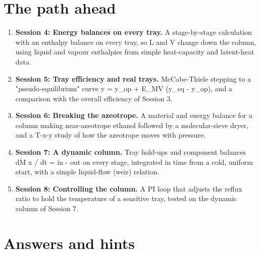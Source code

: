 \documentclass[11pt,a4paper]{article}
\begin{document}
\section{The path ahead}
\begin{enumerate}[nosep]
\item \textbf{Session 4: Energy balances on every tray.} A stage-by-stage calculation with an enthalpy balance on every tray, so L and V change down the column, using liquid and vapour enthalpies from simple heat-capacity and latent-heat data.
\item \textbf{Session 5: Tray efficiency and real trays.} McCabe-Thiele stepping to a "pseudo-equilibrium" curve y = y\_op + E\_MV (y\_eq - y\_op), and a comparison with the overall efficiency of Session 3.
\item \textbf{Session 6: Breaking the azeotrope.} A material and energy balance for a column making near-azeotrope ethanol followed by a molecular-sieve dryer, and a T-x-y study of how the azeotrope moves with pressure.
\item \textbf{Session 7: A dynamic column.} Tray hold-ups and component balances dM x / dt = in - out on every stage, integrated in time from a cold, uniform start, with a simple liquid-flow (weir) relation.
\item \textbf{Session 8: Controlling the column.} A PI loop that adjusts the reflux ratio to hold the temperature of a sensitive tray, tested on the dynamic column of Session 7.
\end{enumerate}

\section{Answers and hints}
\end{document}
